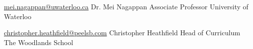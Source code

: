 

\begin{cventries}

  \cventry
    {\href{mailto:mei.nagappan@uwaterloo.ca}{mei.nagappan@uwaterloo.ca}} %
    {Dr. Mei Nagappan} %
    {Associate Professor} %
    {University of Waterloo} %

  \cventry
    {\href{mailto:christopher.heathfield@peelsb.com}{christopher.heathfield@peelsb.com}} %
    {Christopher Heathfield} %
    {Head of Curriculum} %
    {The Woodlands School} %


\end{cventries}
